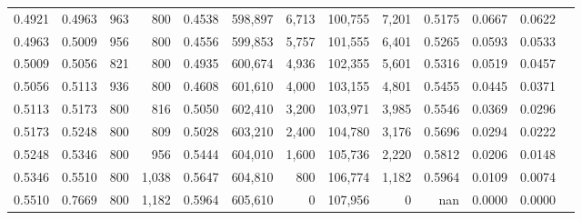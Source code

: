 \begin{tabular}{rrrrrrrrrrrrr}
0.4921 & 0.4963 &    963 &   800 &                                     0.4538 & 598,897 &   6,713 & 100,755 &   7,201 & 0.5175 & 0.0667 & 0.0622 \\
0.4963 & 0.5009 &    956 &   800 &                                     0.4556 & 599,853 &   5,757 & 101,555 &   6,401 & 0.5265 & 0.0593 & 0.0533 \\
0.5009 & 0.5056 &    821 &   800 &                                     0.4935 & 600,674 &   4,936 & 102,355 &   5,601 & 0.5316 & 0.0519 & 0.0457 \\
0.5056 & 0.5113 &    936 &   800 &                                     0.4608 & 601,610 &   4,000 & 103,155 &   4,801 & 0.5455 & 0.0445 & 0.0371 \\
0.5113 & 0.5173 &    800 &   816 &                                     0.5050 & 602,410 &   3,200 & 103,971 &   3,985 & 0.5546 & 0.0369 & 0.0296 \\
0.5173 & 0.5248 &    800 &   809 &                                     0.5028 & 603,210 &   2,400 & 104,780 &   3,176 & 0.5696 & 0.0294 & 0.0222 \\
0.5248 & 0.5346 &    800 &   956 &                                     0.5444 & 604,010 &   1,600 & 105,736 &   2,220 & 0.5812 & 0.0206 & 0.0148 \\
0.5346 & 0.5510 &    800 & 1,038 &                                     0.5647 & 604,810 &     800 & 106,774 &   1,182 & 0.5964 & 0.0109 & 0.0074 \\
0.5510 & 0.7669 &    800 & 1,182 &                                     0.5964 & 605,610 &       0 & 107,956 &       0 &    nan & 0.0000 & 0.0000 \\
\bottomrule
\end{tabular}
